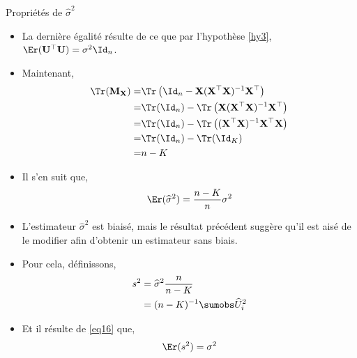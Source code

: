 \begin{frame}[allowframebreaks]{Propriétés de $\widehat{\sigma}^2$}
\begin{itemize}
\begin{align*}
=&\sigma^2\Tr(\mathbf{M}_\mathbf{X})
\end{align*}
\item La dernière égalité résulte de ce que par l'hypothèse \ref{hy3}, $\Er(\mathbf{U}^\top\mathbf{U}) = \sigma^2\Id_n$. 
\item Maintenant,
\begin{align*}
\Tr(\mathbf{M}_\mathbf{X}) = &\Tr\left(\Id_n - \mathbf{X}(\mathbf{X}^\top\mathbf{X})^{-1}\mathbf{X}^\top\right)\\
=&\Tr(\Id_n) - \Tr\left(
\mathbf{X}(\mathbf{X}^\top\mathbf{X})^{-1}\mathbf{X}^\top\right)\\
=&\Tr(\Id_n) - \Tr\left((\mathbf{X}^\top\mathbf{X})^{-1}\mathbf{X}^\top\mathbf{X}\right)\\
=&\Tr(\Id_n) - \Tr(\Id_K)\\
=&n-K
\end{align*}
\item Il s'en suit que,
\begin{align}
\Er(\widehat{\sigma}^2) = \frac{n-K}{n}\sigma^2
\label{eq16}
\end{align}
\item L'estimateur $\widehat{\sigma}^2$ est biaisé, mais le résultat précédent suggère qu'il est aisé de le modifier afin d'obtenir un estimateur sans biais. 
\item Pour cela, définissons,
\begin{align*}
s^2 &= \widehat{\sigma}^2\frac{n}{n-K}\\
&=(n-K)^{-1}\sumobs \widehat{U}_i^2
\end{align*}
\item Et il résulte de \eqref{eq16} que, 
\begin{align*}
\Er(s^2) = \sigma^2
\end{align*}
\end{itemize}
\end{frame}

